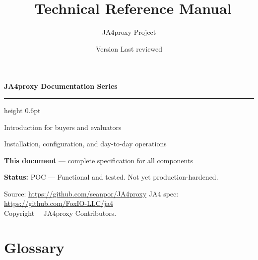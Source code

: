 \documentclass[a4paper, justified, twoside, notoc]{tufte-book}
\title{\ja\ Technical Reference Manual}
\author{JA4proxy Project}
\date{Version \docversion \quad\textbullet\quad Last reviewed \lastreviewed}
\renewcommand{\maketitlepage}{%
  \begin{titlepage}
    \def\covertype{Technical Reference Manual}
    \def\coverdescription{Complete reference for architects, developers, and security engineers}
    \def\coveraccentcolor{ja4navy}
    
  \end{titlepage}
}
\begin{document}
\maketitlepage

\newpage
\thispagestyle{empty}
\vspace*{4cm}
{\noindent\Large\sffamily\bfseries\color{ja4navy} JA4proxy Documentation Series}
\vspace{0.5\baselineskip}
\hrule height 0.6pt
\vspace{0.8\baselineskip}

{\small\sffamily
\begin{description}[leftmargin=4cm, style=nextline]
  \item[Product Overview] Introduction for buyers and evaluators
  \item[Operator's User Guide] Installation, configuration, and day-to-day operations
  \item[\textbf{Technical Reference Manual}] \textbf{This document} — complete specification for all components
\end{description}
}

\vspace{2\baselineskip}
{\small\noindent
\textbf{Status:} POC — Functional and tested. Not yet production-hardened.
}

\vfill
{\footnotesize\sffamily\color{ja4gray}
Source: \url{https://github.com/seanpor/JA4proxy} \quad
JA4 spec: \url{https://github.com/FoxIO-LLC/ja4}\\[4pt]
Copyright \textcopyright\ \the\year\ JA4proxy Contributors.
}
\newpage

{
  \hypersetup{linkcolor=black}
  \setcounter{tocdepth}{2}
  \tableofcontents
  \clearpage
  \listoftables
  \clearpage
}

\mainmatter












\backmatter

\chapter{Glossary}


\printindex

\clearpage
\begin{titlepage}
  
\end{titlepage}
\end{document}
